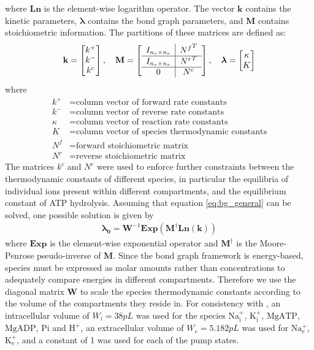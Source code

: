 \documentclass[11pt]{article}
\begin{document}
where $\textbf{Ln}$ is the element-wise logarithm operator. The vector $\mathbf{k}$ contains the kinetic parameters, $\boldsymbol{\lambda}$ contains the bond graph parameters, and $\mathbf{M}$ contains stoichiometric information. The partitions of these matrices are defined as:
\begin{align}
	\textbf{k} = \begin{bmatrix}
	k^+ \\ k^- \\ k^c
	\end{bmatrix}, \quad
	\textbf{M} = \left[ \begin{array}{c | c}
	I_{n_r \times n_r} & {N^f}^T \\ \hline
	I_{n_r \times n_r} & {N^r}^T \\ \hline
	0 & N^c
	\end{array} \right], \quad
	\boldsymbol{\lambda} = \begin{bmatrix}
	\kappa \\ K
	\end{bmatrix}
	\label{eq:standard}
\end{align}
where
\begin{align}
	k^+ &= \text{column vector of forward rate constants} \\
	k^- &= \text{column vector of reverse rate constants} \\
	\kappa &= \text{column vector of reaction rate constants} \\
	K &= \text{column vector of species thermodynamic constants} \\
	N^f &= \text{forward stoichiometric matrix} \\
	N^r &= \text{reverse stoichiometric matrix}
\end{align}
The matrices $k^c$ and $N^c$ were used to enforce further constraints between the thermodynamic constants of different species, in particular the equilibria of individual ions present within different compartments, and the equilibrium constant of ATP hydrolysis. Assuming that equation \eqref{eq:bg_general} can be solved, one possible solution is given by
\begin{align}
	\boldsymbol{\lambda_0 } = \mathbf{W}^{-1} \textbf{Exp} (\mathbf{M}^\dagger \textbf{Ln} (\mathbf{k}))
\end{align}
where $\textbf{Exp}$ is the element-wise exponential operator and $\mathbf{M}^\dagger$ is the Moore-Penrose pseudo-inverse of $\mathbf{M}$. Since the bond graph framework is energy-based, species must be expressed as molar amounts rather than concentrations to adequately compare energies in different compartments. Therefore we use the diagonal matrix $\mathbf{W}$ to scale the species thermodynamic constants according to the volume of the compartments they reside in. For consistency with \citet{terkildsen_balance_2007}, an intracellular volume of $W_i = 38\si{pL}$ was used for the species $\mathrm{Na_i^+}$, $\mathrm{K_i^+}$, $\mathrm{MgATP}$, $\mathrm{MgADP}$, $\mathrm{Pi}$ and $\mathrm{H^+}$, an extracellular volume of $W_e = 5.182\si{pL}$ was used for $\mathrm{Na_e^+}$, $\mathrm{K_e^+}$, and a constant of 1 was used for each of the pump states.
\end{document}
